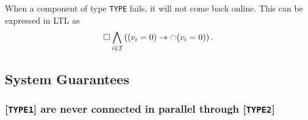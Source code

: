 \documentclass[journal]{IEEEtran}
\renewcommand{\next}{\ocircle}
\begin{document}
When a component of type \texttt{TYPE} fails, it will not come back online. This can be expressed in LTL as
\begin{equation} \square \bigwedge_{i \in \mathcal{I}} \left( (v_i = 0) \rightarrow \next (v_i = 0) \right). \end{equation}


\subsection{System Guarantees} \label{formalspecsG}


\subsubsection{[\texttt{TYPE1}] are never connected in parallel through [\texttt{TYPE2}]} 
\end{document}
